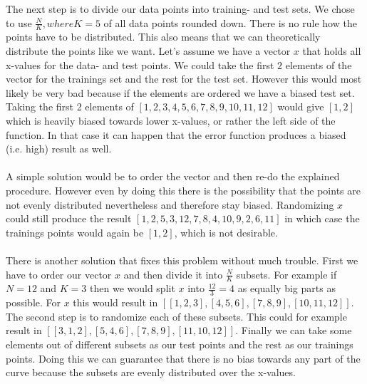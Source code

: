\documentclass{article}
\begin{document}
\FloatBarrier


\noindent The next step is to divide our data points into training- and test sets. We chose to use $\frac{N}{K}, where K = 5$ of all data points rounded down. There is no rule how the points have to be distributed. This also means that we can theoretically distribute the points like we want. Let's assume we have a vector $x$ that holds all x-values for the data- and test points. We could take the first $2$ elements of the vector for the trainings set and the rest for the test set. However this would most likely be very bad because if the elements are ordered we have a biased test set. Taking the first 2 elements of $[1,2,3,4,5,6,7,8,9,10,11,12]$ would give $[1,2]$ which is heavily biased towards lower x-values, or rather the left side of the function. In that case it can happen that the error function produces a biased (i.e. high) result as well. \\
\\
A simple solution would be to order the vector and then re-do the explained procedure. However even by doing this there is the possibility that the points are not evenly distributed nevertheless and therefore stay biased. Randomizing $x$ could still produce the result $[1,2,5,3,12,7,8,4,10,9,2,6,11]$ in which case the trainings points would again be $[1,2]$, which is not desirable. \\
\\
There is another solution that fixes this problem without much trouble. First we have to order our vector $x$ and then divide it into $\frac{N}{K}$ subsets. For example if $N = 12$ and $K = 3$ then we would split $x$ into $\frac{12}{3} = 4$ as equally big parts as possible. For $x$ this would result in $[[1,2,3],[4,5,6],[7,8,9],[10,11,12]]$. The second step is to randomize each of these subsets. This could for example result in $[[3,1,2],[5,4,6],[7,8,9],[11,10,12]]$. Finally we can take some elements out of different subsets as our test points and the rest as our trainings points. Doing this we can guarantee that there is no bias towards any part of the curve because the subsets are evenly distributed over the x-values.
\end{document}
